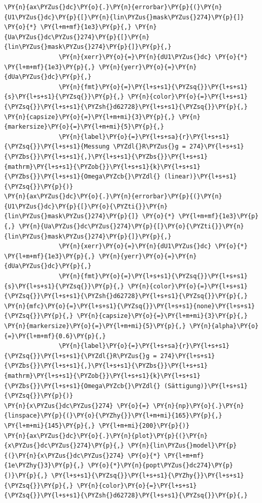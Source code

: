\begin{tcolorbox}[breakable, size=fbox, boxrule=1pt, pad at break*=1mm,colback=cellbackground, colframe=cellborder]
\begin{Verbatim}[commandchars=\\\{\}]
\PY{n}{ax\PYZus{}dc}\PY{o}{.}\PY{n}{errorbar}\PY{p}{(}\PY{n}{U1\PYZus{}dc}\PY{p}{[}\PY{n}{lin\PYZus{}mask\PYZus{}274}\PY{p}{]} \PY{o}{*} \PY{l+m+mf}{1e3}\PY{p}{,} \PY{n}{Ua\PYZus{}dc\PYZus{}274}\PY{p}{[}\PY{n}{lin\PYZus{}mask\PYZus{}274}\PY{p}{]}\PY{p}{,}
               \PY{n}{xerr}\PY{o}{=}\PY{n}{dU1\PYZus{}dc} \PY{o}{*} \PY{l+m+mf}{1e3}\PY{p}{,} \PY{n}{yerr}\PY{o}{=}\PY{n}{dUa\PYZus{}dc}\PY{p}{,}
               \PY{n}{fmt}\PY{o}{=}\PY{l+s+s1}{\PYZsq{}}\PY{l+s+s1}{s}\PY{l+s+s1}{\PYZsq{}}\PY{p}{,} \PY{n}{color}\PY{o}{=}\PY{l+s+s1}{\PYZsq{}}\PY{l+s+s1}{\PYZsh{}d62728}\PY{l+s+s1}{\PYZsq{}}\PY{p}{,} \PY{n}{capsize}\PY{o}{=}\PY{l+m+mi}{3}\PY{p}{,} \PY{n}{markersize}\PY{o}{=}\PY{l+m+mi}{5}\PY{p}{,}
               \PY{n}{label}\PY{o}{=}\PY{l+s+sa}{r}\PY{l+s+s1}{\PYZsq{}}\PY{l+s+s1}{Messung \PYZdl{}R\PYZus{}g = 274}\PY{l+s+s1}{\PYZbs{}}\PY{l+s+s1}{,}\PY{l+s+s1}{\PYZbs{}}\PY{l+s+s1}{mathrm}\PY{l+s+s1}{\PYZob{}}\PY{l+s+s1}{k}\PY{l+s+s1}{\PYZbs{}}\PY{l+s+s1}{Omega\PYZcb{}\PYZdl{} (linear)}\PY{l+s+s1}{\PYZsq{}}\PY{p}{)}
\PY{n}{ax\PYZus{}dc}\PY{o}{.}\PY{n}{errorbar}\PY{p}{(}\PY{n}{U1\PYZus{}dc}\PY{p}{[}\PY{o}{\PYZti{}}\PY{n}{lin\PYZus{}mask\PYZus{}274}\PY{p}{]} \PY{o}{*} \PY{l+m+mf}{1e3}\PY{p}{,} \PY{n}{Ua\PYZus{}dc\PYZus{}274}\PY{p}{[}\PY{o}{\PYZti{}}\PY{n}{lin\PYZus{}mask\PYZus{}274}\PY{p}{]}\PY{p}{,}
               \PY{n}{xerr}\PY{o}{=}\PY{n}{dU1\PYZus{}dc} \PY{o}{*} \PY{l+m+mf}{1e3}\PY{p}{,} \PY{n}{yerr}\PY{o}{=}\PY{n}{dUa\PYZus{}dc}\PY{p}{,}
               \PY{n}{fmt}\PY{o}{=}\PY{l+s+s1}{\PYZsq{}}\PY{l+s+s1}{s}\PY{l+s+s1}{\PYZsq{}}\PY{p}{,} \PY{n}{color}\PY{o}{=}\PY{l+s+s1}{\PYZsq{}}\PY{l+s+s1}{\PYZsh{}d62728}\PY{l+s+s1}{\PYZsq{}}\PY{p}{,} \PY{n}{mfc}\PY{o}{=}\PY{l+s+s1}{\PYZsq{}}\PY{l+s+s1}{none}\PY{l+s+s1}{\PYZsq{}}\PY{p}{,} \PY{n}{capsize}\PY{o}{=}\PY{l+m+mi}{3}\PY{p}{,} \PY{n}{markersize}\PY{o}{=}\PY{l+m+mi}{5}\PY{p}{,} \PY{n}{alpha}\PY{o}{=}\PY{l+m+mf}{0.6}\PY{p}{,}
               \PY{n}{label}\PY{o}{=}\PY{l+s+sa}{r}\PY{l+s+s1}{\PYZsq{}}\PY{l+s+s1}{\PYZdl{}R\PYZus{}g = 274}\PY{l+s+s1}{\PYZbs{}}\PY{l+s+s1}{,}\PY{l+s+s1}{\PYZbs{}}\PY{l+s+s1}{mathrm}\PY{l+s+s1}{\PYZob{}}\PY{l+s+s1}{k}\PY{l+s+s1}{\PYZbs{}}\PY{l+s+s1}{Omega\PYZcb{}\PYZdl{} (Sättigung)}\PY{l+s+s1}{\PYZsq{}}\PY{p}{)}
\PY{n}{x\PYZus{}dc\PYZus{}274} \PY{o}{=} \PY{n}{np}\PY{o}{.}\PY{n}{linspace}\PY{p}{(}\PY{o}{\PYZhy{}}\PY{l+m+mi}{165}\PY{p}{,} \PY{l+m+mi}{145}\PY{p}{,} \PY{l+m+mi}{200}\PY{p}{)}
\PY{n}{ax\PYZus{}dc}\PY{o}{.}\PY{n}{plot}\PY{p}{(}\PY{n}{x\PYZus{}dc\PYZus{}274}\PY{p}{,} \PY{n}{lin\PYZus{}model}\PY{p}{(}\PY{n}{x\PYZus{}dc\PYZus{}274} \PY{o}{*} \PY{l+m+mf}{1e\PYZhy{}3}\PY{p}{,} \PY{o}{*}\PY{n}{popt\PYZus{}dc274}\PY{p}{)}\PY{p}{,} \PY{l+s+s1}{\PYZsq{}}\PY{l+s+s1}{\PYZhy{}}\PY{l+s+s1}{\PYZsq{}}\PY{p}{,} \PY{n}{color}\PY{o}{=}\PY{l+s+s1}{\PYZsq{}}\PY{l+s+s1}{\PYZsh{}d62728}\PY{l+s+s1}{\PYZsq{}}\PY{p}{,}

\end{Verbatim}
\end{tcolorbox}
